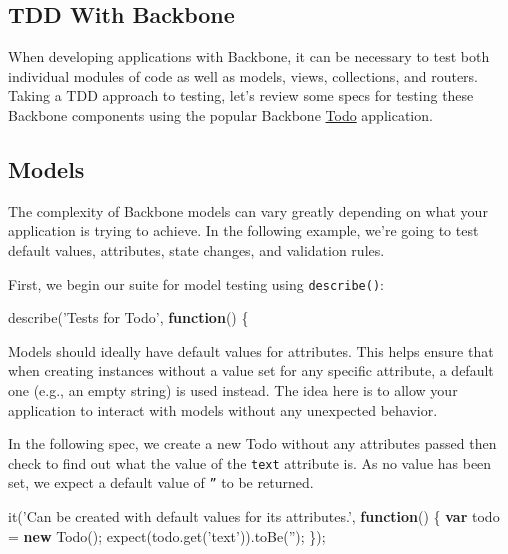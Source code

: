 \documentclass[9pt]{book}
\newenvironment{Shaded}{}{}
\newcommand{\KeywordTok}[1]{\textcolor[rgb]{0.00,0.44,0.13}{\textbf{{#1}}}}
\newcommand{\StringTok}[1]{\textcolor[rgb]{0.25,0.44,0.63}{{#1}}}
\newcommand{\OtherTok}[1]{\textcolor[rgb]{0.00,0.44,0.13}{{#1}}}
\newcommand{\FunctionTok}[1]{\textcolor[rgb]{0.02,0.16,0.49}{{#1}}}
\newcommand{\NormalTok}[1]{{#1}}
\begin{document}
\subsection{TDD With Backbone}\label{tdd-with-backbone}

When developing applications with Backbone, it can be necessary to test
both individual modules of code as well as models, views, collections,
and routers. Taking a TDD approach to testing, let's review some specs
for testing these Backbone components using the popular Backbone
\href{https://github.com/addyosmani/todomvc/tree/master/todo-example/backbone}{Todo}
application.

\subsection{Models}\label{models-2}

The complexity of Backbone models can vary greatly depending on what
your application is trying to achieve. In the following example, we're
going to test default values, attributes, state changes, and validation
rules.

First, we begin our suite for model testing using \texttt{describe()}:

\begin{Shaded}
\begin{Highlighting}[]
\FunctionTok{describe}\NormalTok{(}\StringTok{'Tests for Todo'}\NormalTok{, }\KeywordTok{function}\NormalTok{() \{}
\end{Highlighting}
\end{Shaded}

Models should ideally have default values for attributes. This helps
ensure that when creating instances without a value set for any specific
attribute, a default one (e.g., an empty string) is used instead. The
idea here is to allow your application to interact with models without
any unexpected behavior.

In the following spec, we create a new Todo without any attributes
passed then check to find out what the value of the \texttt{text}
attribute is. As no value has been set, we expect a default value of
\texttt{''} to be returned.

\begin{Shaded}
\begin{Highlighting}[]
\FunctionTok{it}\NormalTok{(}\StringTok{'Can be created with default values for its attributes.'}\NormalTok{, }\KeywordTok{function}\NormalTok{() \{}
    \KeywordTok{var} \NormalTok{todo = }\KeywordTok{new} \FunctionTok{Todo}\NormalTok{();}
    \FunctionTok{expect}\NormalTok{(}\OtherTok{todo}\NormalTok{.}\FunctionTok{get}\NormalTok{(}\StringTok{'text'}\NormalTok{)).}\FunctionTok{toBe}\NormalTok{(}\StringTok{''}\NormalTok{);}
\NormalTok{\});}
\end{Highlighting}
\end{Shaded}
\end{document}
